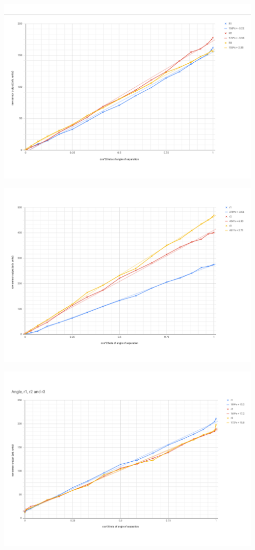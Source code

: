\documentclass{article}
\begin{document}
\includegraphics[keepaspectratio=true,width=\dimmin{}{\dimwidth{0.90}}]{images/green}{}%

\noindent{}\includegraphics[keepaspectratio=true,width=\dimmin{}{\dimwidth{0.90}}]{images/blue}{}%

\noindent{}\includegraphics[keepaspectratio=true,width=\dimmin{}{\dimwidth{0.90}}]{images/red}{}%
\end{document}
